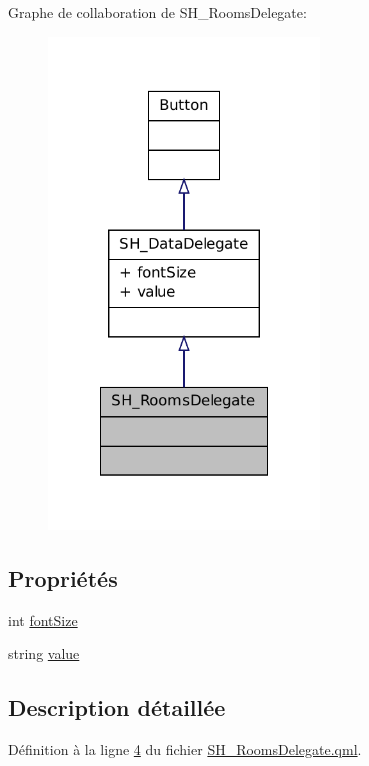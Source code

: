Graphe de collaboration de S\-H\-\_\-\-Rooms\-Delegate\-:\nopagebreak
\begin{figure}[H]
\begin{center}
\leavevmode
\includegraphics[width=204pt]{classSH__RoomsDelegate__coll__graph}
\end{center}
\end{figure}
\subsection*{Propriétés}
\begin{DoxyCompactItemize}
\item 
int \hyperlink{classSH__DataDelegate_afbb41ad9b513c7f27e7b5ad90d82e95b}{font\-Size}
\item 
string \hyperlink{classSH__DataDelegate_acb9da3c73493c88865e08d9575f26482}{value}
\end{DoxyCompactItemize}


\subsection{Description détaillée}


Définition à la ligne \hyperlink{SH__RoomsDelegate_8qml_source_l00004}{4} du fichier \hyperlink{SH__RoomsDelegate_8qml_source}{S\-H\-\_\-\-Rooms\-Delegate.\-qml}.



